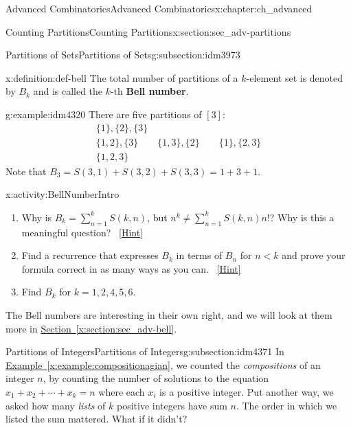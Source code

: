 \documentclass[oneside,10pt,]{book}
\newcommand{\terminology}[1]{\textbf{#1}}
\numberwithin{equation}{chapter}
\newcommand{\lt}{<}
\begin{document}
\begin{chapterptx}{Advanced Combinatorics}{}{Advanced Combinatorics}{}{}{x:chapter:ch_advanced}
\begin{sectionptx}{Counting Partitions}{}{Counting Partitions}{}{}{x:section:sec_adv-partitions}
\begin{subsectionptx}{Partitions of Sets}{}{Partitions of Sets}{}{}{g:subsection:idm3973}
\begin{definition}{}{x:definition:def-bell}%
%
%
The total number of partitions of a \(k\)-element set is denoted by \(B_k\) and is called the \(k\)-th \terminology{Bell number}.%
\end{definition}
\begin{example}{}{g:example:idm4320}%
There are five partitions of \([3]\):%
\begin{gather*}
\{1\}, \{2\},\{3\}\\
\{1,2\},\{3\} \qquad \{1,3\},\{2\} \qquad \{1\}, \{2,3\}\\
\{1,2,3\}
\end{gather*}
Note that \(B_3 = S(3,1)+S(3,2)+S(3,3) = 1 + 3 + 1\).%
\end{example}
\begin{activity}{}{x:activity:BellNumberIntro}%
\begin{enumerate}[font=\bfseries,label=(\alph*),ref=\alph*]
\item{}Why is \(B_k = \sum_{n=1}^{k} S(k,n)\), but \(n^k \ne \sum_{n=1}^k S(k,n)n!\)?  Why is this a meaningful question?%
\qquad~\hfill{\tiny\hyperlink{g:hint:idm4334-back}{[Hint]}}\item{}Find a recurrence that expresses \(B_k\) in terms of \(B_n\) for \(n\lt  k\) and prove your formula correct in as many ways as you can.%
\qquad~\hfill{\tiny\hyperlink{g:hint:idm4344-back}{[Hint]}}\item{}Find \(B_k\) for \(k=1,2,4,5,6\).%
\end{enumerate}
\end{activity}
The Bell numbers are interesting in their own right, and we will look at them more in \hyperref[x:section:sec_adv-bell]{Section~\ref{x:section:sec_adv-bell}}.%
\end{subsectionptx}
%
%
\typeout{************************************************}
\typeout{************************************************}
%
\begin{subsectionptx}{Partitions of Integers}{}{Partitions of Integers}{}{}{g:subsection:idm4371}
In \hyperref[x:example:compositionagian]{Example~\ref{x:example:compositionagian}}, we counted the \emph{compositions} of an integer \(n\), by counting the number of solutions to the equation \(x_1 + x_2 + \cdots + x_k = n\) where each \(x_i\) is a positive integer.  Put another way, we asked how many \emph{lists} of \(k\) positive integers have sum \(n\).  The order in which we listed the sum mattered.  What if it didn't?%

\end{subsectionptx}
\end{sectionptx}
\end{chapterptx}
\end{document}
